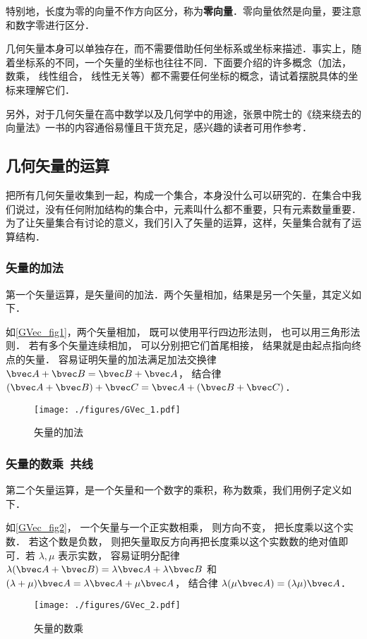 特别地，长度为零的向量不作方向区分，称为\textbf{零向量}．零向量依然是向量，要注意和数字零进行区分．

几何矢量本身可以单独存在，而不需要借助任何坐标系或坐标来描述．事实上，随着坐标系的不同，一个矢量的坐标也往往不同．下面要介绍的许多概念（加法， 数乘， 线性组合， 线性无关等）都不需要任何坐标的概念，请试着摆脱具体的坐标来理解它们．

另外，对于几何矢量在高中数学以及几何学中的用途，张景中院士的《绕来绕去的向量法》一书的内容通俗易懂且干货充足，感兴趣的读者可用作参考．

\subsection{几何矢量的运算}

把所有几何矢量收集到一起，构成一个集合，本身没什么可以研究的．在集合中我们说过，没有任何附加结构的集合中，元素叫什么都不重要，只有元素数量重要．为了让矢量集合有讨论的意义，我们引入了矢量的运算，这样，矢量集合就有了运算结构．

\subsubsection{矢量的加法}
第一个矢量运算，是矢量间的加法．两个矢量相加，结果是另一个矢量，其定义如下．

如\autoref{GVec_fig1}，两个矢量相加， 既可以使用平行四边形法则， 也可以用三角形法则． 若有多个矢量连续相加， 可以分别把它们首尾相接， 结果就是由起点指向终点的矢量． 容易证明矢量的加法满足加法交换律 $\bvec A + \bvec B = \bvec B + \bvec A$， 结合律 $(\bvec A + \bvec B) + \bvec C = \bvec A + (\bvec B + \bvec C)$．
\begin{figure}[ht]
\centering
\texttt{[image: ./figures/GVec\_1.pdf]}
\caption{矢量的加法} \label{GVec_fig1}
\end{figure}

\subsubsection{矢量的数乘\ 共线}
第二个矢量运算，是一个矢量和一个数字的乘积，称为数乘，我们用例子定义如下．

如\autoref{GVec_fig2}， 一个矢量与一个正实数相乘， 则方向不变， 把长度乘以这个实数． 若这个数是负数， 则把矢量取反方向再把长度乘以这个实数数的绝对值即可．若 $\lambda, \mu$ 表示实数， 容易证明分配律 $\lambda(\bvec A + \bvec B) = \lambda\bvec A + \lambda\bvec B$ 和 $(\lambda+\mu)\bvec A = \lambda\bvec A + \mu\bvec A$， 结合律 $\lambda(\mu\bvec A) = (\lambda\mu) \bvec A$．
\begin{figure}[ht]
\centering
\texttt{[image: ./figures/GVec\_2.pdf]}
\caption{矢量的数乘} \label{GVec_fig2}
\end{figure}

